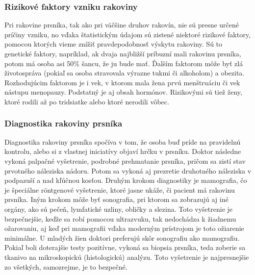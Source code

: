 \subsubsection{Rizikové faktory vzniku rakoviny}
\hspace{10mm}Pri rakovine prsníka, tak ako pri väčšine druhov rakovín, nie sú presne určené príčiny vzniku, no vďaka štatistickým údajom sú zistené niektoré rizikové faktory, pomocou ktorých vieme znížiť pravdepodobnosť výskytu rakoviny. Sú to genetické faktory, napríklad, ak dvaja najbližší príbuzní mali rakovinu prsníka, potom má osoba asi 50\% šancu, že ju bude mať. Ďalším faktorom môže byť zlá životospráva (pokiaľ sa osoba stravovala výrazne tukmi či alkoholom)  a obezita. Rozhodujúcim faktorom je i vek, v ktorom mala žena prvú menštruáciu či  vek nástupu menopauzy. Podstatný je aj obsah hormónov. Rizikovými sú tiež ženy, ktoré rodili až po tridsiatke alebo ktoré nerodili vôbec.

\subsubsection{Diagnostika rakoviny prsníka}
\hspace{10mm}Diagnostika rakoviny prsníka spočíva v tom, že osoba buď príde na pravidelnú kontrolu, alebo si z vlastnej iniciatívy objaví hrčku v prsníku. Doktor následne vykoná palpačné vyšetrenie, podrobné prehmatanie prsníka, pričom sa zistí stav prvotného náleziska nádoru. Potom sa vykoná aj prezretie druhotného náleziska v podpazuší a nad kľúčnou kosťou. Druhým  krokom  diagnostiky je mamografia, čo je špeciálne röntgenové vyšetrenie, ktoré jasne ukáže, či pacient má rakovinu prsníka. Iným  krokom môže byť sonografia, pri ktorom sa zobrazujú aj iné orgány, ako sú pečeň, lymfatické uzliny, obličky a slezina. Toto vyšetrenie je bezpečnejšie, keďže sa robí pomocou ultrazvuku, tak nedochádza k žiadnemu ožarovaniu, aj keď pri mamografii vďaka moderným prístrojom je toto ožiarenie minimálne. U mladých žien doktori preferujú skôr sonografiu ako mamografiu. Pokiaľ boli doterajšie testy pozitívne, vykoná sa biopsia prsníka, teda zoberie sa tkanivo na mikroskopickú (histologickú) analýzu. Toto vyšetrenie je najpresnejšie zo všetkých, samozrejme, je to bezpečné. \cite{RAKOVINA-PRSNÍKA}

